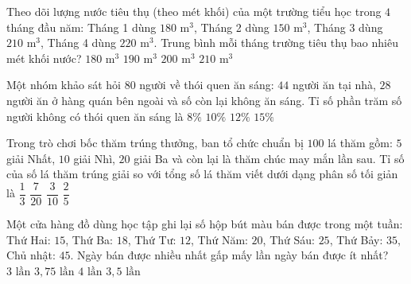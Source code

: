 \begin{ex} %
Theo dõi lượng nước tiêu thụ (theo mét khối) của một trường tiểu học trong $4$ tháng đầu năm: Tháng 1 dùng $180\text{ m}^3$, Tháng 2 dùng $150\text{ m}^3$, Tháng 3 dùng $210\text{ m}^3$, Tháng 4 dùng $220\text{ m}^3$. Trung bình mỗi tháng trường tiêu thụ bao nhiêu mét khối nước?
\choice
{$180\text{ m}^3$}
{\True $190\text{ m}^3$}
{$200\text{ m}^3$}
{$210\text{ m}^3$}
\end{ex}

\begin{ex} %
Một nhóm khảo sát hỏi $80$ người về thói quen ăn sáng: $44$ người ăn tại nhà, $28$ người ăn ở hàng quán bên ngoài và số còn lại không ăn sáng. Tỉ số phần trăm số người không có thói quen ăn sáng là
\choice
{$8\%$}
{\True $10\%$}
{$12\%$}
{$15\%$}
\end{ex}

\begin{ex} %
Trong trò chơi bốc thăm trúng thưởng, ban tổ chức chuẩn bị $100$ lá thăm gồm: $5$ giải Nhất, $10$ giải Nhì, $20$ giải Ba và còn lại là thăm chúc may mắn lần sau. Tỉ số của số lá thăm trúng giải so với tổng số lá thăm viết dưới dạng phân số tối giản là
\choice
{$\dfrac{1}{3}$}
{\True $\dfrac{7}{20}$}
{$\dfrac{3}{10}$}
{$\dfrac{2}{5}$}
\end{ex}

\begin{ex} %
Một cửa hàng đồ dùng học tập ghi lại số hộp bút màu bán được trong một tuần: Thứ Hai: $15$, Thứ Ba: $18$, Thứ Tư: $12$, Thứ Năm: $20$, Thứ Sáu: $25$, Thứ Bảy: $35$, Chủ nhật: $45$. Ngày bán được nhiều nhất gấp mấy lần ngày bán được ít nhất?
\choice
{$3\text{ lần}$}
{\True $3{,}75\text{ lần}$}
{$4\text{ lần}$}
{$3{,}5\text{ lần}$}
\end{ex}


